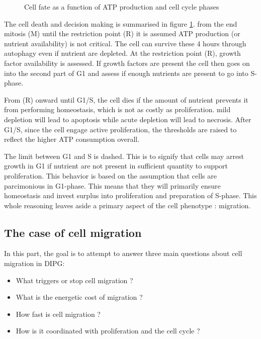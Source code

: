 \documentclass[11pt,a4paper]{article}
\begin{document}
\begin{figure}[ht!]
\begin{tikzpicture}
\end{tikzpicture}
\caption{Cell fate as a function of ATP production and cell cycle phases \label{cell fate}}
\end{figure}

The cell death and decision making is summarised in figure \ref{cell fate}. from the end mitosis (M) until the restriction point (R) it is assumed ATP production (or nutrient availability) is not critical. The cell can survive these 4 hours through autophagy even if nutrient are depleted. At the restriction point (R), growth factor availability is assessed. If growth factors are present the cell then goes on into the second part of G1 and assess if enough nutrients are present to go into S-phase.

From (R) onward until G1/S, the cell dies if the amount of nutrient prevents it from performing homeostasis, which is not as costly as proliferation. mild depletion will lead to apoptosis while acute depletion will lead to necrosis. After G1/S, since the cell engage active proliferation, the thresholds are raised to reflect the higher ATP consumption overall.

The limit between G1 and S is dashed. This is to signify that cells may arrest growth in G1 if nutrient are not present in sufficient quantity to support proliferation. This behavior is based on the assumption that cells are parcimonious in G1-phase. This means that they will primarily ensure homeostasis and invest surplus into proliferation and preparation of S-phase. This whole reasoning leaves aside a primary aspect of the cell phenotype : migration.

\subsection{The case of cell migration}
In this part, the goal is to attempt to answer three main questions about cell migration in DIPG: 
\begin{itemize}
\item What triggers or stop cell migration ?
\item What is the energetic cost of migration ?
\item How fast is cell migration ?
\item How is it coordinated with proliferation and the cell cycle ? 
\end{itemize}
\end{document}
